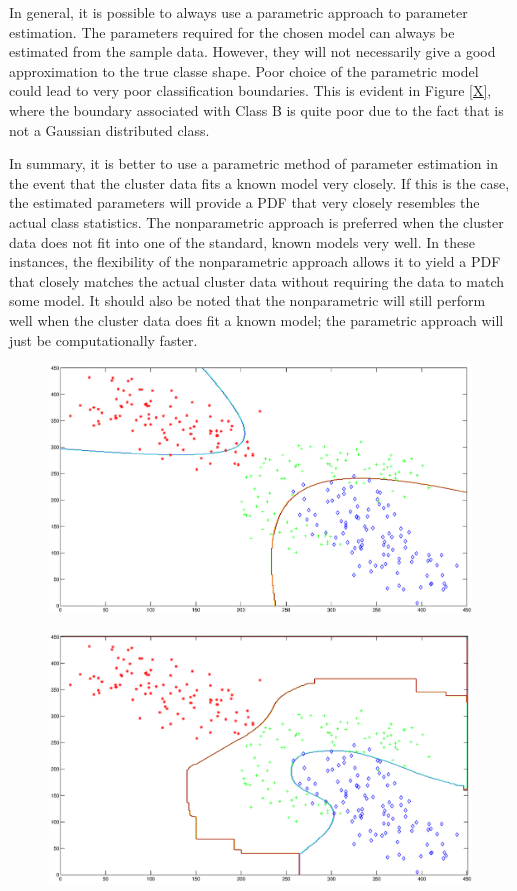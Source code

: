 In general, it is possible to always use a parametric approach to parameter
estimation.  The parameters required for the chosen model can always be
estimated from the sample data.  However, they will not necessarily give a good
approximation to the true classe shape.  Poor choice of the parametric model
could lead to very poor classification boundaries.  This is evident in Figure
\ref{X}, where the boundary associated with Class B is quite poor due to the
fact that is not a Gaussian distributed class.

In summary, it is better to use a parametric method of parameter estimation in
the event that the cluster data fits a known model very closely.  If this is
the case, the estimated parameters will provide a PDF that very closely
resembles the actual class statistics.  The nonparametric approach is preferred
when the cluster data does not fit into one of the standard, known models very
well.  In these instances, the flexibility of the nonparametric approach allows
it to yield a PDF that closely matches the actual cluster data without
requiring the data to match some model.  It should also be noted that the
nonparametric will still perform well when the cluster data does fit a known
model; the parametric approach will just be computationally faster.

\begin{figure}
\label{}
\includegraphics[scale=0.4]{twod-par}
\caption{}
\end{figure}

\begin{figure}
\label{}
\includegraphics[scale=0.4]{twod-nonpar}
\caption{}
\end{figure}